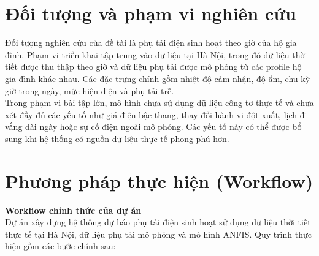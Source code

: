 \section{Đối tượng và phạm vi nghiên cứu}

Đối tượng nghiên cứu của đề tài là phụ tải điện sinh hoạt theo giờ của hộ gia đình. Phạm vi triển khai tập trung vào dữ liệu tại Hà Nội, trong đó dữ liệu thời tiết được thu thập theo giờ và dữ liệu phụ tải được mô phỏng từ các profile hộ gia đình khác nhau. Các đặc trưng chính gồm nhiệt độ cảm nhận, độ ẩm, chu kỳ giờ trong ngày, mức hiện diện và phụ tải trễ.
\\
Trong phạm vi bài tập lớn, mô hình chưa sử dụng dữ liệu công tơ thực tế và chưa xét đầy đủ các yếu tố như giá điện bậc thang, thay đổi hành vi đột xuất, lịch đi vắng dài ngày hoặc sự cố điện ngoài mô phỏng. Các yếu tố này có thể được bổ sung khi hệ thống có nguồn dữ liệu thực tế phong phú hơn.

\section{Phương pháp thực hiện (Workflow)}

\textbf{Workflow chính thức của dự án}
\\
Dự án xây dựng hệ thống dự báo phụ tải điện sinh hoạt sử dụng dữ liệu thời tiết thực tế tại Hà Nội, dữ liệu phụ tải mô phỏng và mô hình ANFIS. Quy trình thực hiện gồm các bước chính sau:

